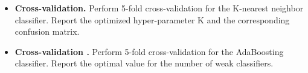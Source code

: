 \documentclass[11pt]{article}
\begin{document}
\begin{itemize}
        \item \textbf{Cross-validation.} Perform 5-fold cross-validation for the K-nearest neighbor classifier. Report the
        optimized hyper-parameter K and the corresponding confusion matrix.

        \item \textbf{Cross-validation .} Perform 5-fold cross-validation for the AdaBoosting classifier.
        Report the optimal value for the number of weak classifiers.
    \end{itemize}
\end{document}
